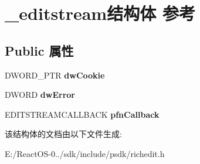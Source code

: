 \hypertarget{struct__editstream}{}\section{\+\_\+editstream结构体 参考}
\label{struct__editstream}
\subsection*{Public 属性}
\begin{DoxyCompactItemize}
\item 
\mbox{\label{struct__editstream_a733bc21163ccba8e014b2ad79aab8354}} 
D\+W\+O\+R\+D\+\_\+\+P\+TR {\bfseries dw\+Cookie}
\item 
\mbox{\label{struct__editstream_ad6faf41d0d28b990e8bd2feb2f9a26d0}} 
D\+W\+O\+RD {\bfseries dw\+Error}
\item 
\mbox{\label{struct__editstream_a5df9683709604bbbead2d8edf0d34ccb}} 
E\+D\+I\+T\+S\+T\+R\+E\+A\+M\+C\+A\+L\+L\+B\+A\+CK {\bfseries pfn\+Callback}
\end{DoxyCompactItemize}


该结构体的文档由以下文件生成\+:\begin{DoxyCompactItemize}
\item 
E\+:/\+React\+O\+S-\/0../sdk/include/psdk/richedit.\+h\end{DoxyCompactItemize}
